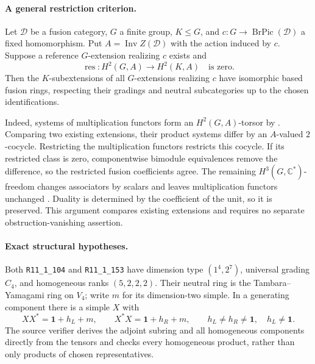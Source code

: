 \documentclass[11pt,a4paper]{article}
\begin{document}
\paragraph{A general restriction criterion.}
Let $\mathcal D$ be a fusion category, $G$ a finite group, $K\le G$, and
$c:G\to\operatorname{BrPic}(\mathcal D)$ a fixed homomorphism.
Put $A=\operatorname{Inv}Z(\mathcal D)$ with the action induced by $c$.
Suppose a reference $G$-extension realizing $c$ exists and
\[
 \operatorname{res}:H^2(G,A)\longrightarrow H^2(K,A)
 \quad\text{is zero.}
\]
Then the $K$-subextensions of all $G$-extensions realizing $c$ have
isomorphic based fusion rings, respecting their gradings and neutral
subcategories up to the chosen identifications.

Indeed, systems of multiplication functors form an $H^2(G,A)$-torsor
by \cite[Theorem~8.5]{ENOHomotopy}. Comparing two existing extensions,
their product systems differ by an $A$-valued $2$-cocycle. Restricting
the multiplication functors restricts this cocycle. If its restricted
class is zero, componentwise bimodule equivalences remove the
difference, so the restricted fusion coefficients agree. The remaining
$H^3(G,\mathbb C^*)$-freedom changes associators by scalars and leaves
multiplication functors unchanged
\cite[Theorem~8.9]{ENOHomotopy}. Duality is determined by the coefficient
of the unit, so it is preserved. This argument compares existing
extensions and requires no separate obstruction-vanishing assertion.

\paragraph{Exact structural hypotheses.}
Both \texttt{R11\_1\_104} and \texttt{R11\_1\_153} have dimension type
$(1^4,2^7)$, universal grading $C_4$, and homogeneous ranks $(5,2,2,2)$.
Their neutral ring is the Tambara--Yamagami ring on $V_4$; write $m$ for
its dimension-two simple. In a generating component there is a simple
$X$ with
\[
 XX^*=\mathbf1+h_L+m,\qquad X^*X=\mathbf1+h_R+m,
 \qquad h_L\ne h_R\ne\mathbf1,\quad h_L\ne\mathbf1.
\]
The source verifier derives the adjoint subring and all homogeneous
components directly from the tensors and checks every homogeneous
product, rather than only products of chosen representatives.
\end{document}
